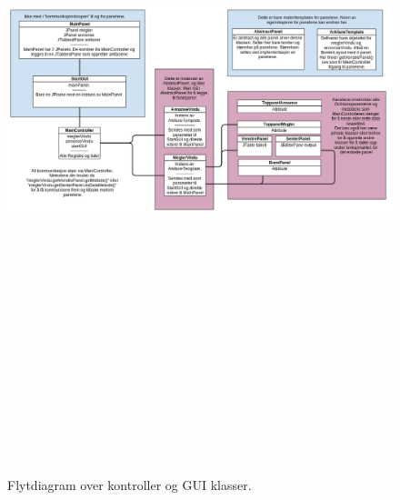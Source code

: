 \begin{figure}[ht]
\begin{center}
 \includegraphics[angle=90, height=21cm]{./img/appendix/diagram/controller_og_gui.png}
 \caption[Kontroller og GUI]{Flytdiagram over kontroller og GUI klasser.}
 \label{fig:kontroller_og_gui}
 \end{center}
\end{figure}


